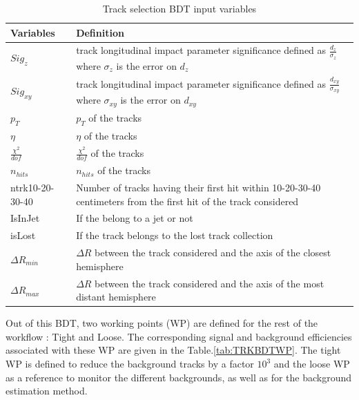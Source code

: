 \documentclass{cernatlasnote}
\begin{document}
\begin{table}[h]
\centering
        \begin{tabular}{|m{6cm}||m{9cm}|}
        \hline
        \rowcolor{lightgray} 
         \centering Variables & Definition\\
        \hline
        \centering $Sig_{z}$ & track longitudinal impact parameter significance defined as $\frac{d_{z}}{\sigma_{z}}$  where $\sigma_{z}$ is the error on $d_{z}$ \\
        \hline
        \centering$Sig_{xy}$ & track longitudinal impact parameter significance defined as $\frac{d_{xy}}{\sigma_{xy}}$  where $\sigma_{xy}$ is the error on $d_{xy}$ \\
        \hline
        \centering $p_{T}$  &   $p_{T}$ of the tracks \\
        \hline
        \centering $\eta$ & $\eta$ of the tracks  \\
        \hline
        \centering $\frac{\chi^2}{dof}$  &   $\frac{\chi^2}{dof}$ of the tracks\\     
        \hline
        \centering $n_{hits}$  &   $n_{hits}$ of the tracks\\
        \hline
        \centering ntrk10-20-30-40 & Number of tracks having their first hit within 10-20-30-40 centimeters from the first hit of the track considered\\
        \hline
        \centering IsInJet & If the belong to a jet or not\\
        \hline
        \centering isLost & If the track belongs to the lost track collection\\
        \hline
        \centering $\Delta R_{min}$ & $\Delta R$ between the track considered and the axis of the closest hemisphere\\
        \hline
        \centering $\Delta R_{max}$ & $\Delta R$ between the track considered and the axis of the most distant hemisphere\\
        \hline
        \end{tabular}
        \caption{Track selection BDT input variables}
        \label{tab:TRKBDTVAR}
\end{table}
        
Out of this BDT, two working points (WP) are defined for the rest of the workflow : Tight and Loose. The corresponding signal and background efficiencies associated with these WP are given in the Table.\ref{tab:TRKBDTWP}. The tight WP is defined to reduce the background tracks by a factor $10^3$ and the loose WP as a reference to monitor the different backgrounds, as well as for the background estimation method. 
\end{document}
